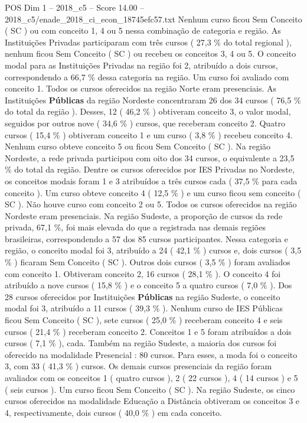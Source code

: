 \begin{textsample}{POS Dim 1 – 2018\_c5 – Score 14.00 – 2018\_c5/enade\_2018\_ci\_econ\_18745efc57.txt}
Nenhum curso ficou Sem Conceito ( SC ) ou com conceito 1, 4 ou 5 nessa combinação de categoria e região.
As Instituições Privadas participaram com três cursos ( 27,3 \% do total regional ), nenhum ficou Sem Conceito ( SC ) ou recebeu os conceitos 3, 4 ou 5.
O conceito modal para as Instituições Privadas na região foi 2, atribuído a dois cursos, correspondendo a 66,7 \% dessa categoria na região.
Um curso foi avaliado com conceito 1.
Todos os cursos oferecidos na região Norte eram presenciais.
As Instituições \textbf{Públicas} da região Nordeste concentraram 26 dos 34 cursos ( 76,5 \% do total da região ).
Desses, 12 ( 46,2 \% ) obtiveram conceito 3, o valor modal, seguidos por outros nove ( 34,6 \% ) cursos, que receberam conceito 2.
Quatro cursos ( 15,4 \% ) obtiveram conceito 1 e um curso ( 3,8 \% ) recebeu conceito 4.
Nenhum curso obteve conceito 5 ou ficou Sem Conceito ( SC ).
Na região Nordeste, a rede privada participou com oito dos 34 cursos, o equivalente a 23,5 \% do total da região.
Dentre os cursos oferecidos por IES Privadas no Nordeste, os conceitos modais foram 1 e 3 atribuídos a três cursos cada ( 37,5 \% para cada conceito ).
Um curso obteve conceito 4 ( 12,5 \% ) e um curso ficou sem conceito ( SC ).
Não houve curso com conceito 2 ou 5.
Todos os cursos oferecidos na região Nordeste eram presenciais.
Na região Sudeste, a proporção de cursos da rede privada, 67,1 \%, foi mais elevada do que a registrada nas demais regiões brasileiras, correspondendo a 57 dos 85 cursos participantes.
Nessa categoria e região, o conceito modal foi 3, atribuído a 24 ( 42,1 \% ) cursos e, dois cursos ( 3,5 \% ) ficaram Sem Conceito ( SC ).
Outros dois cursos ( 3,5 \% ) foram avaliados com conceito 1.
Obtiveram conceito 2, 16 cursos ( 28,1 \% ).
O conceito 4 foi atribuído a nove cursos ( 15,8 \% ) e o conceito 5 a quatro cursos ( 7,0 \% ).
Dos 28 cursos oferecidos por Instituições \textbf{Públicas} na região Sudeste, o conceito modal foi 3, atribuído a 11 cursos ( 39,3 \% ).
Nenhum curso de IES Públicas ficou Sem Conceito ( SC ), sete cursos ( 25,0 \% ) receberam conceito 4 e seis cursos ( 21,4 \% ) receberam conceito 2.
Conceitos 1 e 5 foram atribuídos a dois cursos ( 7,1 \% ), cada.
Também na região Sudeste, a maioria dos cursos foi oferecido na modalidade Presencial : 80 cursos.
Para esses, a moda foi o conceito 3, com 33 ( 41,3 \% ) cursos.
Os demais cursos presenciais da região foram avaliados com os conceitos 1 ( quatro cursos ), 2 ( 22 cursos ), 4 ( 14 cursos ) e 5 ( seis cursos ).
Um curso ficou Sem Conceito ( SC ).
Na região Sudeste, os cinco cursos oferecidos na modalidade Educação a Distância obtiveram os conceitos 3 e 4, respectivamente, dois cursos ( 40,0 \% ) em cada conceito.

\end{textsample}
